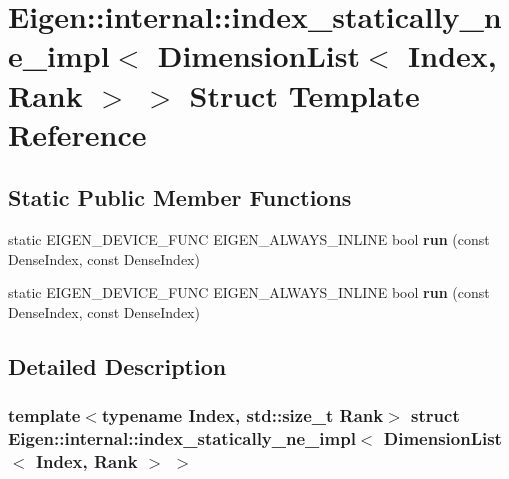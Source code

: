 \hypertarget{struct_eigen_1_1internal_1_1index__statically__ne__impl_3_01_dimension_list_3_01_index_00_01_rank_01_4_01_4}{}\section{Eigen\+:\+:internal\+:\+:index\+\_\+statically\+\_\+ne\+\_\+impl$<$ Dimension\+List$<$ Index, Rank $>$ $>$ Struct Template Reference}
\label{struct_eigen_1_1internal_1_1index__statically__ne__impl_3_01_dimension_list_3_01_index_00_01_rank_01_4_01_4}
\subsection*{Static Public Member Functions}
\begin{DoxyCompactItemize}
\item 
\mbox{\label{struct_eigen_1_1internal_1_1index__statically__ne__impl_3_01_dimension_list_3_01_index_00_01_rank_01_4_01_4_a62ba260622d5607667745e9cc5f204b4}} 
static E\+I\+G\+E\+N\+\_\+\+D\+E\+V\+I\+C\+E\+\_\+\+F\+U\+NC E\+I\+G\+E\+N\+\_\+\+A\+L\+W\+A\+Y\+S\+\_\+\+I\+N\+L\+I\+NE bool {\bfseries run} (const Dense\+Index, const Dense\+Index)
\item 
\mbox{\label{struct_eigen_1_1internal_1_1index__statically__ne__impl_3_01_dimension_list_3_01_index_00_01_rank_01_4_01_4_a62ba260622d5607667745e9cc5f204b4}} 
static E\+I\+G\+E\+N\+\_\+\+D\+E\+V\+I\+C\+E\+\_\+\+F\+U\+NC E\+I\+G\+E\+N\+\_\+\+A\+L\+W\+A\+Y\+S\+\_\+\+I\+N\+L\+I\+NE bool {\bfseries run} (const Dense\+Index, const Dense\+Index)
\end{DoxyCompactItemize}


\subsection{Detailed Description}
\subsubsection*{template$<$typename Index, std\+::size\+\_\+t Rank$>$\newline
struct Eigen\+::internal\+::index\+\_\+statically\+\_\+ne\+\_\+impl$<$ Dimension\+List$<$ Index, Rank $>$ $>$}



